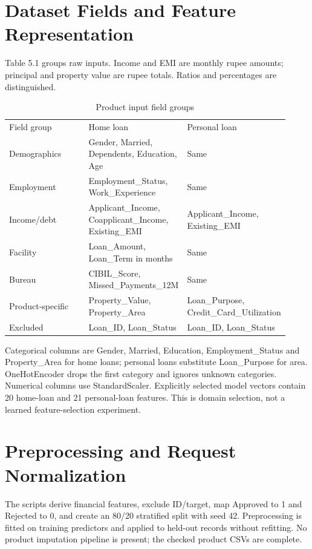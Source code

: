 \documentclass[12pt,a4paper]{report}
\begin{document}
\section{Dataset Fields and Feature Representation}
Table 5.1 groups raw inputs. Income and EMI are monthly rupee amounts; principal and property value are rupee totals. Ratios and percentages are distinguished.

\begin{longtable}{p{0.307\linewidth}p{0.307\linewidth}p{0.307\linewidth}}
\caption{Product input field groups}\\

Field group & Home loan & Personal loan\\
Demographics & Gender, Married, Dependents, Education, Age & Same\\
Employment & Employment\_Status, Work\_Experience & Same\\
Income/debt & Applicant\_Income, Coapplicant\_Income, Existing\_EMI & Applicant\_Income, Existing\_EMI\\
Facility & Loan\_Amount, Loan\_Term in months & Same\\
Bureau & CIBIL\_Score, Missed\_Payments\_12M & Same\\
Product-specific & Property\_Value, Property\_Area & Loan\_Purpose, Credit\_Card\_Utilization\\
Excluded & Loan\_ID, Loan\_Status & Loan\_ID, Loan\_Status\\
\end{longtable}
Categorical columns are Gender, Married, Education, Employment\_Status and Property\_Area for home loans; personal loans substitute Loan\_Purpose for area. OneHotEncoder drops the first category and ignores unknown categories. Numerical columns use StandardScaler. Explicitly selected model vectors contain 20 home-loan and 21 personal-loan features. This is domain selection, not a learned feature-selection experiment.

\section{Preprocessing and Request Normalization}
The scripts derive financial features, exclude ID/target, map Approved to 1 and Rejected to 0, and create an 80/20 stratified split with seed 42. Preprocessing is fitted on training predictors and applied to held-out records without refitting. No product imputation pipeline is present; the checked product CSVs are complete.
\end{document}

